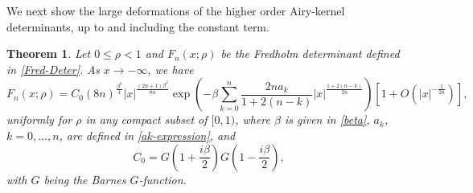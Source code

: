 \documentclass[11pt,a4paper]{article}
\newtheorem{thm}{Theorem}[section]
\numberwithin{equation}{section}
\begin{document}
We next show the large deformations of the higher order Airy-kernel determinants, up to and including the constant term.
%
\begin{thm}\label{thm:largegap}
Let  $0\leq \rho<1$ and  $F_n(x;\rho)$ be the Fredholm determinant defined in \eqref{Fred-Deter}. As $x\to-\infty$,  we have
\begin{equation}\label{F-asymptotic-infty2}
F_n(x;\rho)=C_0(8n)^{\frac{\beta^2}{4}}|x|^{\frac{(2n+1)\beta^2}{8n}}\exp\left(
-\beta\sum_{k=0}^{n}\frac{2na_k}{1+2(n-k)}|x|^{\frac{1+2(n-k)}{2n}}\right)
\left[1+O\left(|x|^{-\frac{1}{2n}}\right)\right],
\end{equation}
uniformly for $\rho$ in any compact subset of $[0,1)$, where $\beta$ is given in \eqref{beta}, $a_k$, $k=0,\ldots,n$, are defined in \eqref{ak-expression}, and
\begin{equation}\label{C0}
 C_0=G\left(1+\frac{i\beta}{2}\right)G\left(1-\frac{i\beta}{2}\right),
\end{equation}
with $G$  being the Barnes  $G$-function.
\end{thm}
\end{document}
